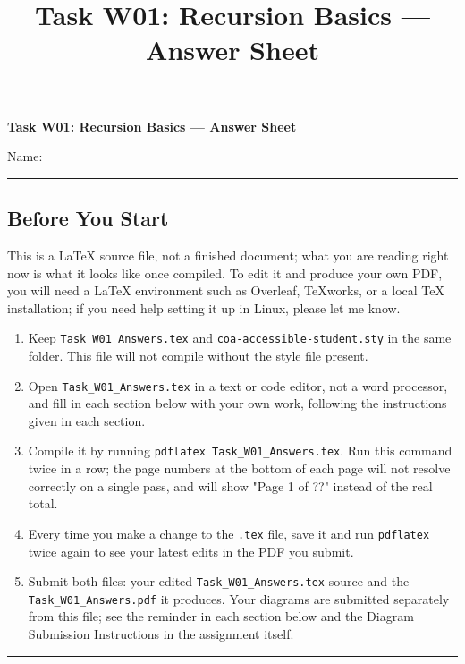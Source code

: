 \documentclass[11pt]{article}
\title{Task W01: Recursion Basics --- Answer Sheet}
\begin{document}
{\centering
{\Large\bfseries\color{coaNavy} Task W01: Recursion Basics --- Answer Sheet\par}
\vspace{0.6em}
}
\noindent Name: \underline{\hspace{3.2in}}
\vspace{1em}

\begin{center}
\rule{0.95\linewidth}{0.6pt}
\end{center}
\subsection*{Before You Start}
\noindent
This is a LaTeX source file, not a finished document; what you are reading
right now is what it looks like once compiled. To edit it and produce your
own PDF, you will need a LaTeX environment such as Overleaf, TeXworks, or a
local TeX installation; if you need help setting it up in Linux, please let
me know.

\begin{enumerate}[leftmargin=1.4em]
  \item Keep \texttt{Task\_W01\_Answers.tex} and
        \texttt{coa-accessible-student.sty} in the same folder. This file
        will not compile without the style file present.
  \item Open \texttt{Task\_W01\_Answers.tex} in a text or code editor, not a
        word processor, and fill in each section below with your own work,
        following the instructions given in each section.
  \item Compile it by running \texttt{pdflatex Task\_W01\_Answers.tex}. Run
        this command twice in a row; the page numbers at the bottom of each
        page will not resolve correctly on a single pass, and will show
        "Page 1 of ??" instead of the real total.
  \item Every time you make a change to the \texttt{.tex} file, save it and
        run \texttt{pdflatex} twice again to see your latest edits in the
        PDF you submit.
  \item Submit both files: your edited \texttt{Task\_W01\_Answers.tex}
        source and the \texttt{Task\_W01\_Answers.pdf} it produces. Your
        diagrams are submitted separately from this file; see the reminder
        in each section below and the Diagram Submission Instructions in
        the assignment itself.
\end{enumerate}
\begin{center}
\rule{0.95\linewidth}{0.6pt}
\end{center}
\vspace{0.6em}
\end{document}
